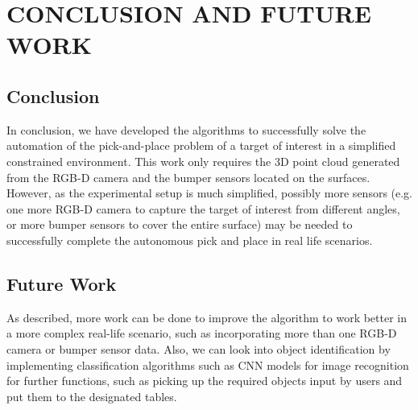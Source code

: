 \section{CONCLUSION AND FUTURE WORK}\label{Sec:concl}
\subsection{Conclusion}
In conclusion, we have developed the algorithms to successfully solve the automation of the pick-and-place problem of a target of interest in a simplified constrained environment. This work only requires the 3D point cloud generated from the RGB-D camera and the bumper sensors located on the surfaces. However, as the experimental setup is much simplified, possibly more sensors (e.g. one more RGB-D camera to capture the target of interest from different angles, or more bumper sensors to cover the entire surface) may be needed to successfully complete the autonomous pick and place in real life scenarios.  


\subsection{Future Work}
As described, more work can be done to improve the algorithm to work better in a more complex real-life scenario, such as incorporating more than one RGB-D camera or bumper sensor data. Also, we can look into object identification by implementing classification algorithms such as CNN models for image recognition for further functions, such as picking up the required objects input by users and put them to the designated tables.   
